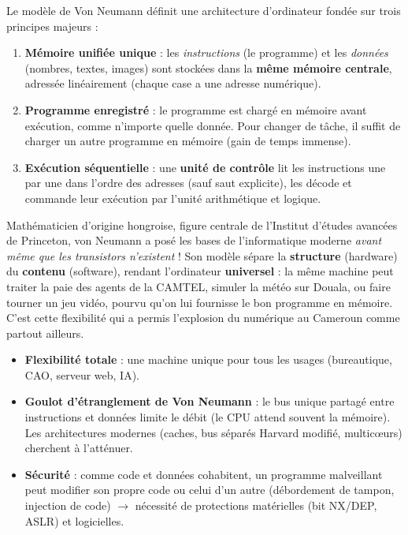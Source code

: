 \documentclass[11pt]{article}
\newcommand{\cle}[1]{{\popxbold\color{popdark}#1}}
\begin{document}
\begin{definition}
Le \cle{modèle de Von Neumann} définit une architecture d'ordinateur fondée sur trois principes majeurs :
\begin{enumerate}
    \item \textbf{Mémoire unifiée unique} : les \emph{instructions} (le programme) et les \emph{données} (nombres, textes, images) sont stockées dans la \textbf{même mémoire centrale}, adressée linéairement (chaque case a une adresse numérique).
    \item \textbf{Programme enregistré} : le programme est chargé en mémoire avant exécution, comme n'importe quelle donnée. Pour changer de tâche, il suffit de charger un autre programme en mémoire (gain de temps immense).
    \item \textbf{Exécution séquentielle} : une \textbf{unité de contrôle} lit les instructions une par une dans l'ordre des adresses (sauf saut explicite), les décode et commande leur exécution par l'unité arithmétique et logique.
\end{enumerate}
\end{definition}

\begin{savaistu}
Mathématicien d'origine hongroise, figure centrale de l'Institut d'études avancées de Princeton, von Neumann a posé les bases de l'informatique moderne \emph{avant même que les transistors n'existent} ! Son modèle sépare la \textbf{structure} (hardware) du \textbf{contenu} (software), rendant l'ordinateur \textbf{universel} : la même machine peut traiter la paie des agents de la CAMTEL, simuler la météo sur Douala, ou faire tourner un jeu vidéo, pourvu qu'on lui fournisse le bon programme en mémoire. C'est cette flexibilité qui a permis l'explosion du numérique au Cameroun comme partout ailleurs.
\end{savaistu}

\begin{propriete}
\begin{itemize}
    \item \textbf{Flexibilité totale} : une machine unique pour tous les usages (bureautique, CAO, serveur web, IA).
    \item \textbf{Goulot d'étranglement de Von Neumann} : le bus unique partagé entre instructions et données limite le débit (le CPU attend souvent la mémoire). Les architectures modernes (caches, bus séparés Harvard modifié, multicœurs) cherchent à l'atténuer.
    \item \textbf{Sécurité} : comme code et données cohabitent, un programme malveillant peut modifier son propre code ou celui d'un autre (débordement de tampon, injection de code) $\rightarrow$ nécessité de protections matérielles (bit NX/DEP, ASLR) et logicielles.
\end{itemize}
\end{propriete}
\end{document}
